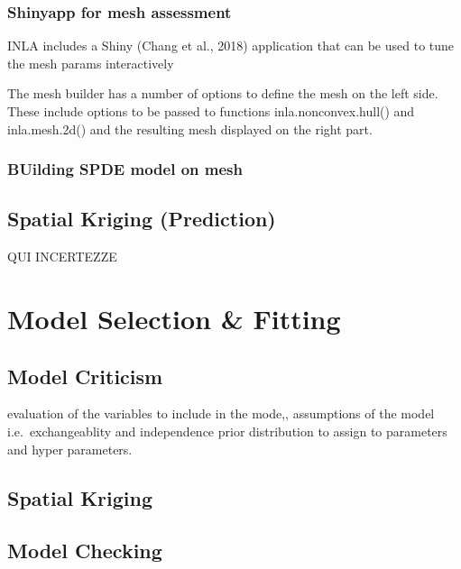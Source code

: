 \documentclass[
  12pt,
  a4paper,
  oneside]{book}
\theoremstyle{definition}
\theoremstyle{definition}
\theoremstyle{definition}
\theoremstyle{remark}
\begin{document}
\hypertarget{shinyapp-for-mesh-assessment}{%
\subsection{Shinyapp for mesh assessment}\label{shinyapp-for-mesh-assessment}}

INLA includes a Shiny (Chang et al., 2018) application that can be used to tune the mesh params interactively

The mesh builder has a number of options to define the mesh on the left side. These include options to be passed to functions inla.nonconvex.hull() and inla.mesh.2d() and the resulting mesh displayed on the right part.

\hypertarget{building-spde-model-on-mesh}{%
\subsection{BUilding SPDE model on mesh}\label{building-spde-model-on-mesh}}

\hypertarget{spatial-kriging-prediction}{%
\section{Spatial Kriging (Prediction)}\label{spatial-kriging-prediction}}

QUI INCERTEZZE

\hypertarget{modelspec}{%
\chapter{Model Selection \& Fitting}\label{modelspec}}

\hypertarget{model-criticism}{%
\section{Model Criticism}\label{model-criticism}}

evaluation of the variables to include in the mode,, assumptions of the model i.e.~exchangeablity and independence prior distribution to assign to parameters and hyper parameters.

\hypertarget{spatial-kriging-1}{%
\section{Spatial Kriging}\label{spatial-kriging-1}}

\hypertarget{model-checking-1}{%
\section{Model Checking}\label{model-checking-1}}
\end{document}
